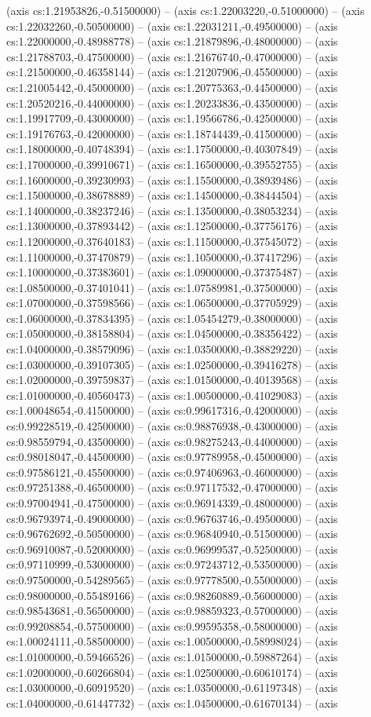 (axis cs:1.21953826,-0.51500000) -- (axis cs:1.22003220,-0.51000000) -- (axis cs:1.22032260,-0.50500000) -- (axis cs:1.22031211,-0.49500000) -- (axis cs:1.22000000,-0.48988778) -- (axis cs:1.21879896,-0.48000000) -- (axis cs:1.21788703,-0.47500000) -- (axis cs:1.21676740,-0.47000000) -- (axis cs:1.21500000,-0.46358144) -- (axis cs:1.21207906,-0.45500000) -- (axis cs:1.21005442,-0.45000000) -- (axis cs:1.20775363,-0.44500000) -- (axis cs:1.20520216,-0.44000000) -- (axis cs:1.20233836,-0.43500000) -- (axis cs:1.19917709,-0.43000000) -- (axis cs:1.19566786,-0.42500000) -- (axis cs:1.19176763,-0.42000000) -- (axis cs:1.18744439,-0.41500000) -- (axis cs:1.18000000,-0.40748394) -- (axis cs:1.17500000,-0.40307849) -- (axis cs:1.17000000,-0.39910671) -- (axis cs:1.16500000,-0.39552755) -- (axis cs:1.16000000,-0.39230993) -- (axis cs:1.15500000,-0.38939486) -- (axis cs:1.15000000,-0.38678889) -- (axis cs:1.14500000,-0.38444504) -- (axis cs:1.14000000,-0.38237246) -- (axis cs:1.13500000,-0.38053234) -- (axis cs:1.13000000,-0.37893442) -- (axis cs:1.12500000,-0.37756176) -- (axis cs:1.12000000,-0.37640183) -- (axis cs:1.11500000,-0.37545072) -- (axis cs:1.11000000,-0.37470879) -- (axis cs:1.10500000,-0.37417296) -- (axis cs:1.10000000,-0.37383601) -- (axis cs:1.09000000,-0.37375487) -- (axis cs:1.08500000,-0.37401041) -- (axis cs:1.07589981,-0.37500000) -- (axis cs:1.07000000,-0.37598566) -- (axis cs:1.06500000,-0.37705929) -- (axis cs:1.06000000,-0.37834395) -- (axis cs:1.05454279,-0.38000000) -- (axis cs:1.05000000,-0.38158804) -- (axis cs:1.04500000,-0.38356422) -- (axis cs:1.04000000,-0.38579096) -- (axis cs:1.03500000,-0.38829220) -- (axis cs:1.03000000,-0.39107305) -- (axis cs:1.02500000,-0.39416278) -- (axis cs:1.02000000,-0.39759837) -- (axis cs:1.01500000,-0.40139568) -- (axis cs:1.01000000,-0.40560473) -- (axis cs:1.00500000,-0.41029083) -- (axis cs:1.00048654,-0.41500000) -- (axis cs:0.99617316,-0.42000000) -- (axis cs:0.99228519,-0.42500000) -- (axis cs:0.98876938,-0.43000000) -- (axis cs:0.98559794,-0.43500000) -- (axis cs:0.98275243,-0.44000000) -- (axis cs:0.98018047,-0.44500000) -- (axis cs:0.97789958,-0.45000000) -- (axis cs:0.97586121,-0.45500000) -- (axis cs:0.97406963,-0.46000000) -- (axis cs:0.97251388,-0.46500000) -- (axis cs:0.97117532,-0.47000000) -- (axis cs:0.97004941,-0.47500000) -- (axis cs:0.96914339,-0.48000000) -- (axis cs:0.96793974,-0.49000000) -- (axis cs:0.96763746,-0.49500000) -- (axis cs:0.96762692,-0.50500000) -- (axis cs:0.96840940,-0.51500000) -- (axis cs:0.96910087,-0.52000000) -- (axis cs:0.96999537,-0.52500000) -- (axis cs:0.97110999,-0.53000000) -- (axis cs:0.97243712,-0.53500000) -- (axis cs:0.97500000,-0.54289565) -- (axis cs:0.97778500,-0.55000000) -- (axis cs:0.98000000,-0.55489166) -- (axis cs:0.98260889,-0.56000000) -- (axis cs:0.98543681,-0.56500000) -- (axis cs:0.98859323,-0.57000000) -- (axis cs:0.99208854,-0.57500000) -- (axis cs:0.99595358,-0.58000000) -- (axis cs:1.00024111,-0.58500000) -- (axis cs:1.00500000,-0.58998024) -- (axis cs:1.01000000,-0.59466526) -- (axis cs:1.01500000,-0.59887264) -- (axis cs:1.02000000,-0.60266804) -- (axis cs:1.02500000,-0.60610174) -- (axis cs:1.03000000,-0.60919520) -- (axis cs:1.03500000,-0.61197348) -- (axis cs:1.04000000,-0.61447732) -- (axis cs:1.04500000,-0.61670134) -- (axis 